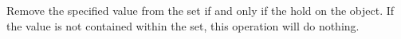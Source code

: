 Remove the specified value from the set if and only if the  hold on
the object.  If the value is not contained within the set, this operation will
do nothing.



